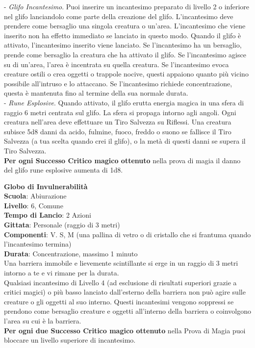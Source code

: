 \begin{multicols}{2}
\medskip

- \textit{Glifo Incantesimo}. Puoi inserire un incantesimo preparato di livello 2 o inferiore nel glifo lanciandolo come parte della creazione del glifo. L'incantesimo deve prendere come bersaglio una singola creatura o un'area. L'incantesimo che viene inserito non ha effetto immediato se lanciato in questo modo. Quando il glifo è attivato, l'incantesimo inserito viene lanciato. Se l'incantesimo ha un bersaglio, prende come bersaglio la creatura che ha attivato il glifo. Se l'incantesimo agisce su di un'area, l'area è incentrata su quella creatura. Se l'incantesimo evoca creature ostili o crea oggetti o trappole nocive, questi appaiono quanto più vicino possibile all'intruso e lo attaccano. Se l'incantesimo richiede concentrazione, questa è mantenuta fino al termine della sua normale durata.\\

- \textit{Rune Esplosive}. Quando attivato, il glifo erutta energia magica in una sfera di raggio 6 metri centrata sul glifo. La sfera si propaga intorno agli angoli. Ogni creatura nell'area deve effettuare un Tiro Salvezza su Riflessi. Una creatura subisce 5d8 danni da acido, fulmine, fuoco, freddo o suono se fallisce il Tiro Salvezza (a tua scelta quando crei il glifo), o la metà di questi danni se supera il Tiro Salvezza.\\
\textbf{Per ogni Successo Critico magico ottenuto} nella prova  di magia il danno del glifo rune esplosive aumenta di 1d8.

\medskip\textbf{Globo di Invulnerabilità}\\
\textbf{Scuola}: Abiurazione\\
\textbf{Livello}: 6, Comune\\
\textbf{Tempo di Lancio}: 2 Azioni\\
\textbf{Gittata}: Personale (raggio di 3 metri)\\
\textbf{Componenti}: V. S, M (una pallina di vetro o di cristallo che si frantuma quando l'incantesimo termina) \\
\textbf{Durata}: Concentrazione, massimo 1 minuto\\
Una barriera immobile e lievemente scintillante si erge in un raggio di 3 metri intorno a te e vi rimane per la durata.\\
Qualsiasi incantesimo di Livello 4 (ad esclusione di risultati superiori grazie a critici magici) o più basso lanciato dall'esterno della barriera non può agire sulle creature o gli oggetti al suo interno. Questi incantesimi vengono soppressi se prendono come bersaglio creature e oggetti all'interno della barriera o coinvolgono l'area su cui è la barriera.\\
\textbf{Per ogni due Successo Critico magico ottenuto} nella Prova di Magia puoi bloccare un livello superiore di incantesimo.


\end{multicols}
